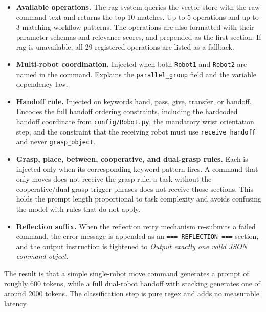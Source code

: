 \documentclass[
     12pt,
     a4paper,
     BCOR=10mm,
     DIV=14,
     listof=totoc,
     bibliography=totoc,
     parskip,
     twoside,
     headsepline
     ]{scrreprt}
\begin{document}
\begin{itemize}
	\item \textbf{Available operations.} The \gls{rag} system queries the vector store with the raw command text and returns the top 10 matches. Up to 5 operations and up to 3 matching workflow patterns. The operations are also formatted with their parameter schemas and relevance scores, and prepended as the first section. If \gls{rag} is unavailable, all 29 registered operations are listed as a fallback.
	\item \textbf{Multi-robot coordination.} Injected when both \texttt{Robot1} and \texttt{Robot2} are named in the command. Explains the \texttt{parallel\_group} field and the variable dependency law.
	\item \textbf{Handoff rule.} Injected on keywords hand, pass, give, transfer, or handoff. Encodes the full handoff ordering constraints, including the hardcoded handoff coordinate from \texttt{config/Robot.py}, the mandatory wrist orientation step, and the constraint that the receiving robot must use \texttt{receive\_handoff} and never \texttt{grasp\_object}.
	\item \textbf{Grasp, place, between, cooperative, and dual-grasp rules.} Each is injected only when its corresponding keyword pattern fires. A command that only moves does not receive the grasp rule; a task without the cooperative/dual-grasp trigger phrases does not receive those sections. This holds the prompt length proportional to task complexity and avoids confusing the model with rules that do not apply.
	\item \textbf{Reflection suffix.} When the reflection retry mechanism re-submits a failed command, the error message is appended as an \texttt{=== REFLECTION ===} section, and the output instruction is tightened to \textit{Output exactly one valid JSON command object}.
\end{itemize}

The result is that a simple single-robot move command generates a prompt of roughly 600 tokens, while a full dual-robot handoff with stacking generates one of around 2000 tokens. The classification step is pure regex and adds no measurable latency.
\end{document}
